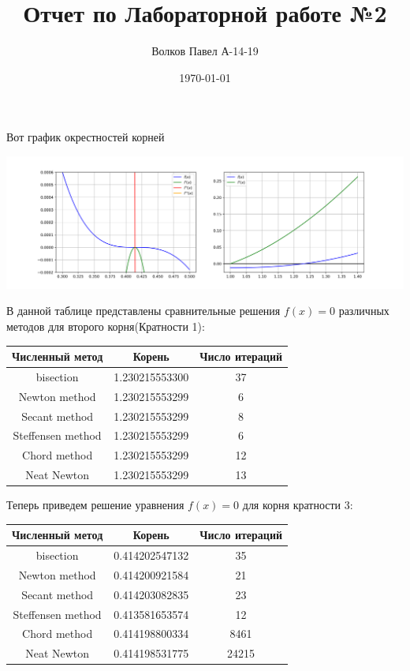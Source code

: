 \documentclass[a4paper,12pt]{report} %
\author{Волков Павел А-14-19}
\title{Отчет по Лабораторной работе №2}
\date{\today}
\begin{document}
Вот график окрестностей корней

\noindent\includegraphics[width=18cm]{2.3_plot_d.png}

\vspace{2em}

В данной таблице представлены сравнительные решения $f(x) = 0$ различных методов для второго корня(Кратности 1):

\begin{tabular}{| c | c | c |}
	\hline
	Численный метод & Корень & Число итераций \\ \hline
	bisection & 1.230215553300 & 37 \\ \hline
	Newton method & 1.230215553299 & 6 \\ \hline
	Secant method & 1.230215553299 & 8 \\ \hline
	Steffensen method & 1.230215553299 & 6 \\ \hline
	Chord method & 1.230215553299 & 12 \\ \hline
	Neat Newton & 1.230215553299 & 13 \\ \hline
\end{tabular}

\vspace{2em}
Теперь приведем решение уравнения $f(x) = 0$ для корня кратности 3:

\begin{tabular}{| c | c | c |}
	\hline
	Численный метод & Корень & Число итераций \\ \hline
	bisection & 0.414202547132 & 35 \\ \hline
	Newton method & 0.414200921584 & 21 \\ \hline
	Secant method & 0.414203082835 & 23 \\ \hline
	Steffensen method & 0.413581653574 & 12 \\ \hline
	Chord method & 0.414198800334 & 8461 \\ \hline
	Neat Newton & 0.414198531775 & 24215 \\ \hline
\end{tabular}
\end{document}
